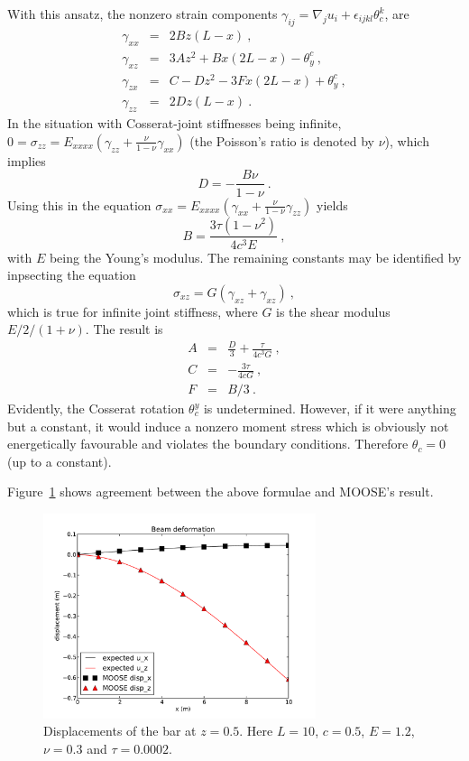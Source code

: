 \documentclass[]{scrreprt}
\begin{document}
With this ansatz, the nonzero strain
components $\gamma_{ij} = \nabla_{j}u_{i} +
\epsilon_{ijkl}\theta_{c}^{k}$, are
\begin{eqnarray}
\gamma_{xx} & = & 2Bz(L-x) \ , \\
\gamma_{xz} & = & 3Az^{2} + Bx(2L-x) - \theta_{y}^{c}\ , \\
\gamma_{zx} & = & C - Dz^{2} - 3Fx(2L - x) + \theta_{y}^{c}\ , \\
\gamma_{zz} & = & 2Dz(L-x) \ .
\end{eqnarray}
In the situation with Cosserat-joint stiffnesses being infinite, $0 =
\sigma_{zz} = E_{xxxx}(\gamma_{zz} + \frac{\nu}{1-\nu}\gamma_{xx})$
(the Poisson's ratio is denoted by $\nu$), which implies
\begin{equation}
D = -\frac{B\nu}{1-\nu} \ .
\end{equation}
Using this in the equation $\sigma_{xx} = E_{xxxx}(\gamma_{xx} +
\frac{\nu}{1-\nu}\gamma_{zz})$ yields
\begin{equation}
B = \frac{3\tau(1 -\nu^{2})}{4c^{3}E} \ ,
\end{equation}
with $E$ being the Young's modulus.  The remaining constants may be
identified by inpsecting the equation
\begin{equation}
\sigma_{xz} = G(\gamma_{xz} + \gamma_{xz}) \ ,
\end{equation}
which is true for infinite joint stiffness, where $G$ is the shear
modulus $E/2/(1+\nu)$.  The result is
\begin{eqnarray}
A & = & \frac{D}{3} + \frac{\tau}{4c^{3}G} \ , \\
C & = & -\frac{3\tau}{4cG} \ , \\
F & = & B/3 \ .
\end{eqnarray}
Evidently, the Cosserat rotation $\theta_{c}^{y}$ is undetermined.
However, if it were anything but a constant, it would induce a nonzero
moment stress which is obviously not energetically favourable and
violates the boundary conditions.  Therefore $\theta_{c}=0$ (up to a constant).

Figure~\ref{cosserat_eam_disp.fig} shows agreement between the above
formulae and MOOSE's result.
\begin{figure}[htb]
\begin{center}
\includegraphics[width=8cm]{cosserat_beam_disp.pdf}
\caption{Displacements of the bar at $z=0.5$.  Here $L=10$, $c=0.5$,
  $E=1.2$, $\nu=0.3$ and $\tau=0.0002$.}
\label{cosserat_eam_disp.fig}
\end{center}
\end{figure}
\end{document}
